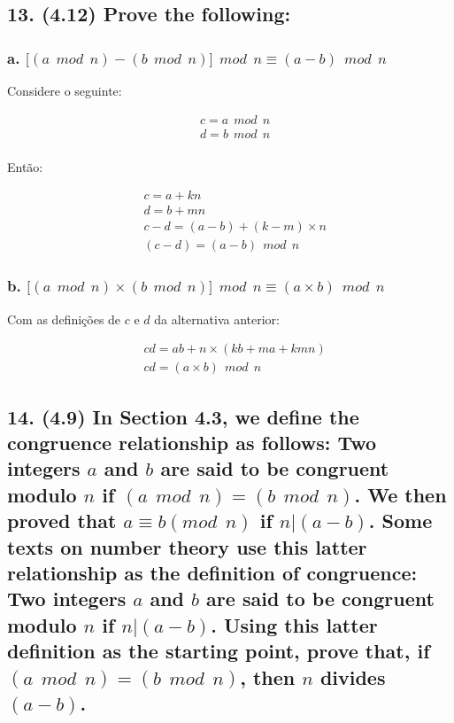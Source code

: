 \documentclass[fleqn, 12pt]{article}
\begin{document}
\subsection*{13. (4.12) Prove the following:}

  \subsubsection*{a. $\lbrack (a \ \ mod \ \ n) - (b \ \ mod \ \ n ) \rbrack
  \ \ mod \ \ n \equiv (a - b) \ \ mod \ \ n$}

    Considere o seguinte:

    \begin{align*}
      & c = a \ \ mod \ \ n \\
      & d = b \ \ mod \ \ n \\
    \end{align*}

    Então:

    \begin{align*}
      & c = a + kn \\
      & d = b + mn \\
      & c - d = (a - b) + (k - m) \times n \\
      & (c - d) = (a - b) \ \ mod \ \ n
    \end{align*}

  \subsubsection*{b. $\lbrack (a \ \ mod \ \ n) \times (b \ \ mod \ \ n )
  \rbrack \ \ mod \ \ n \equiv (a \times b) \ \ mod \ \ n$}

    Com as definições de $c$ e $d$ da alternativa anterior:

    \begin{align*}
      & cd = ab + n \times (kb + ma + kmn) \\
      & cd = (a \times b) \ \ mod \ \ n
    \end{align*}

\subsection*{14. (4.9) In Section 4.3, we define the congruence relationship as
follows: Two integers $a$ and $b$ are said to be congruent modulo $n$ if $(a \ \
mod \ \ n) = (b \ \ mod \ \ n)$. We then proved that $a \equiv b (mod \ \ n)$ if
$n | (a - b)$. Some texts on number theory use this latter relationship as the
definition of congruence: Two integers $a$ and $b$ are said to be congruent
modulo $n$ if $n | (a - b)$. Using this latter definition as the starting point,
prove that, if $(a \ \  mod \ \ n) = (b \ \ mod \ \ n)$, then $n$ divides $(a -
b)$.}
\end{document}
